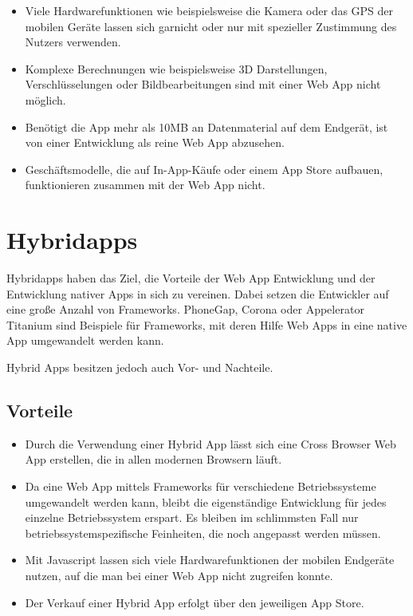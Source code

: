 \begin{itemize}

	\item Viele Hardwarefunktionen wie beispielsweise die Kamera oder das \ac{GPS} der mobilen Geräte lassen sich garnicht oder nur mit spezieller Zustimmung des Nutzers verwenden.

	\item Komplexe Berechnungen wie beispielsweise 3D Darstellungen, Verschlüsselungen oder Bildbearbeitungen sind mit einer Web App nicht möglich.

	\item Benötigt die App mehr als 10MB an Datenmaterial auf dem Endgerät, ist von einer Entwicklung als reine Web App abzusehen.

	\item Geschäftsmodelle, die auf In-App-Käufe oder einem App Store aufbauen, funktionieren zusammen mit der Web App nicht.

\end{itemize}

\section{Hybridapps}
\label{sec:intro:hybrid}

Hybridapps haben das Ziel, die Vorteile der Web App Entwicklung und der Entwicklung nativer Apps in sich zu vereinen. Dabei setzen die Entwickler auf eine große Anzahl von Frameworks. PhoneGap, Corona oder Appelerator Titanium sind Beispiele für Frameworks, mit deren Hilfe Web Apps in eine native App umgewandelt werden kann.

Hybrid Apps besitzen jedoch auch Vor- und Nachteile.

\subsection{Vorteile}
\label{sec:hybrid:pros}

\begin{itemize}

	\item Durch die Verwendung einer Hybrid App lässt sich eine Cross Browser Web App erstellen, die in allen modernen Browsern läuft.

	\item Da eine Web App mittels Frameworks für verschiedene Betriebssysteme umgewandelt werden kann, bleibt die eigenständige Entwicklung für jedes einzelne Betriebssystem erspart. Es bleiben im schlimmsten Fall nur betriebssystemspezifische Feinheiten, die noch angepasst werden müssen.

	\item Mit Javascript lassen sich viele Hardwarefunktionen der mobilen Endgeräte nutzen, auf die man bei einer Web App nicht zugreifen konnte.

	\item Der Verkauf einer Hybrid App erfolgt über den jeweiligen App Store.

\end{itemize}

